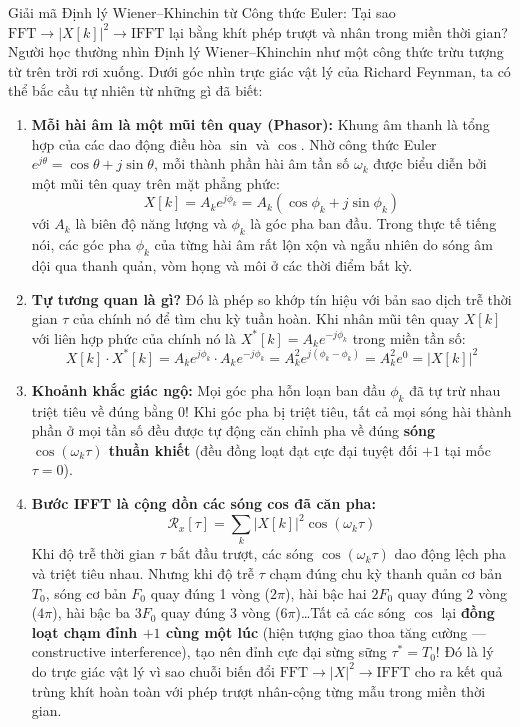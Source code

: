 \documentclass[11pt,a4paper]{article}
\begin{document}
\begin{enumerate}
    \begin{feynmanbox}{Giải mã Định lý Wiener--Khinchin từ Công thức Euler: Tại sao $\text{FFT} \to |X[k]|^2 \to \text{IFFT}$ lại bằng khít phép trượt và nhân trong miền thời gian?}
    Người học thường nhìn Định lý Wiener--Khinchin như một công thức trừu tượng từ trên trời rơi xuống. Dưới góc nhìn trực giác vật lý của Richard Feynman, ta có thể bắc cầu tự nhiên từ những gì đã biết:
    \begin{enumerate}
        \setlength{\itemsep}{1pt}
        \item \textbf{Mỗi hài âm là một mũi tên quay (Phasor):} Khung âm thanh là tổng hợp của các dao động điều hòa $\sin$ và $\cos$. Nhờ công thức Euler $e^{j\theta} = \cos\theta + j\sin\theta$, mỗi thành phần hài âm tần số $\omega_k$ được biểu diễn bởi một mũi tên quay trên mặt phẳng phức:
        \[
        X[k] = A_k e^{j\phi_k} = A_k(\cos\phi_k + j\sin\phi_k)
        \]
        với $A_k$ là biên độ năng lượng và $\phi_k$ là góc pha ban đầu. Trong thực tế tiếng nói, các góc pha $\phi_k$ của từng hài âm rất lộn xộn và ngẫu nhiên do sóng âm dội qua thanh quản, vòm họng và môi ở các thời điểm bất kỳ.
        \item \textbf{Tự tương quan là gì?} Đó là phép so khớp tín hiệu với bản sao dịch trễ thời gian $\tau$ của chính nó để tìm chu kỳ tuần hoàn. Khi nhân mũi tên quay $X[k]$ với liên hợp phức của chính nó là $X^*[k] = A_k e^{-j\phi_k}$ trong miền tần số:
        \[
        X[k] \cdot X^*[k] = A_k e^{j\phi_k} \cdot A_k e^{-j\phi_k} = A_k^2 e^{j(\phi_k - \phi_k)} = A_k^2 e^0 = |X[k]|^2
        \]
        \item \textbf{Khoảnh khắc giác ngộ:} Mọi góc pha hỗn loạn ban đầu $\phi_k$ đã tự trừ nhau triệt tiêu về đúng bằng $0$! Khi góc pha bị triệt tiêu, tất cả mọi sóng hài thành phần ở mọi tần số đều được tự động căn chỉnh pha về đúng \textbf{sóng $\cos(\omega_k \tau)$ thuần khiết} (đều đồng loạt đạt cực đại tuyệt đối $+1$ tại mốc $\tau = 0$).
        \item \textbf{Bước IFFT là cộng dồn các sóng cos đã căn pha:} 
        \[
        \mathcal{R}_x[\tau] = \sum_k |X[k]|^2 \cos(\omega_k \tau)
        \]
        Khi độ trễ thời gian $\tau$ bắt đầu trượt, các sóng $\cos(\omega_k \tau)$ dao động lệch pha và triệt tiêu nhau. Nhưng khi độ trễ $\tau$ chạm đúng chu kỳ thanh quản cơ bản $T_0$, sóng cơ bản $F_0$ quay đúng 1 vòng ($2\pi$), hài bậc hai $2F_0$ quay đúng 2 vòng ($4\pi$), hài bậc ba $3F_0$ quay đúng 3 vòng ($6\pi$)\dots Tất cả các sóng $\cos$ lại \textbf{đồng loạt chạm đỉnh $+1$ cùng một lúc} (hiện tượng giao thoa tăng cường --- constructive interference), tạo nên đỉnh cực đại sừng sững $\tau^* = T_0$! Đó là lý do trực giác vật lý vì sao chuỗi biến đổi $\text{FFT} \to |X|^2 \to \text{IFFT}$ cho ra kết quả trùng khít hoàn toàn với phép trượt nhân-cộng từng mẫu trong miền thời gian.
    \end{enumerate}
    \end{feynmanbox}


\end{enumerate}
\end{document}
